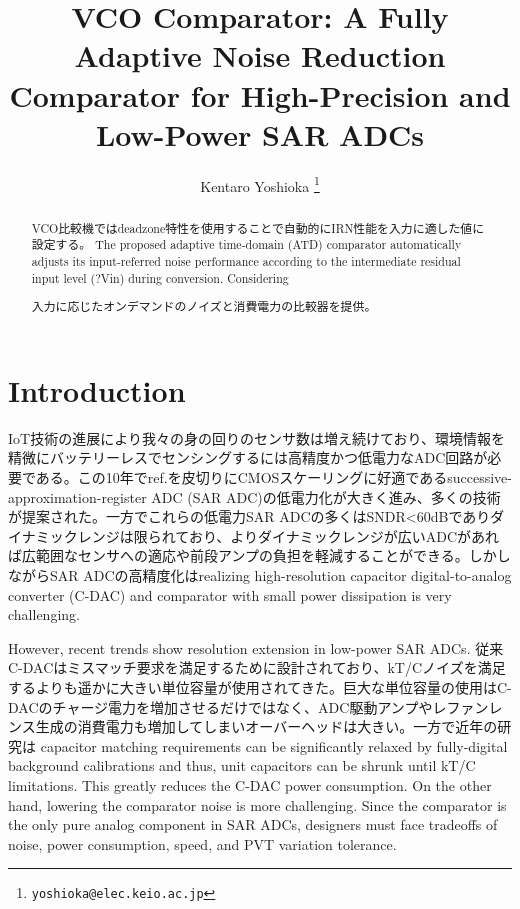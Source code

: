 \documentclass[letterpaper, 10 pt, conference]{ieeeconf}  %
\title{\LARGE \bf
VCO Comparator: A Fully Adaptive Noise Reduction Comparator for High-Precision and Low-Power SAR ADCs
}
\author{Kentaro Yoshioka%
\thanks{
        {\tt\small yoshioka@elec.keio.ac.jp}}
}
\begin{document}
\maketitle
\thispagestyle{empty}
\pagestyle{empty}

\begin{abstract}
VCO比較機ではdeadzone特性を使用することで自動的にIRN性能を入力に適した値に設定する。
The proposed adaptive time-domain (ATD) comparator automatically adjusts its input-referred noise performance according to the intermediate residual input level (?Vin) during conversion. Considering

入力に応じたオンデマンドのノイズと消費電力の比較器を提供。


\end{abstract}

\section{Introduction}
IoT技術の進展により我々の身の回りのセンサ数は増え続けており、環境情報を精微にバッテリーレスでセンシングするには高精度かつ低電力なADC回路が必要である。この10年でref.\cite{van201010}を皮切りにCMOSスケーリングに好適であるsuccessive-approximation-register ADC (SAR ADC)の低電力化が大きく進み、多くの技術が提案された\cite{shikata20120,yoshioka201010,yoshioka20148,zhu201010,tai201411}。一方でこれらの低電力SAR ADCの多くはSNDR<60dBでありダイナミックレンジは限られており、よりダイナミックレンジが広いADCがあれば広範囲なセンサへの適応や前段アンプの負担を軽減することができる。しかしながらSAR ADCの高精度化はrealizing high-resolution capacitor digital-to-analog converter (C-DAC) and comparator with small power dissipation is very challenging. 

However, recent trends show resolution extension in low-power SAR ADCs. 従来C-DACはミスマッチ要求を満足するために設計されており、kT/Cノイズを満足するよりも遥かに大きい単位容量が使用されてきた。巨大な単位容量の使用はC-DACのチャージ電力を増加させるだけではなく、ADC駆動アンプやレファンレンス生成の消費電力も増加してしまいオーバーヘッドは大きい。一方で近年の研究は capacitor matching requirements can be significantly relaxed by fully-digital background calibrations \cite{liu201012b,liu201112,mcneill2011all,mcneill2005split} and thus, unit capacitors can be shrunk until kT/C limitations. This greatly reduces the C-DAC power consumption. 
On the other hand, lowering the comparator noise is more challenging. Since the comparator is the only pure analog component in SAR ADCs, designers must face tradeoffs of noise, power consumption, speed, and PVT variation tolerance.
\end{document}
